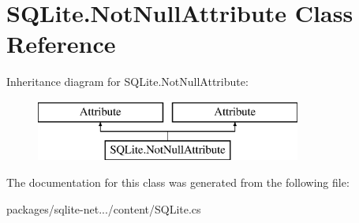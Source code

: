 \hypertarget{classSQLite_1_1NotNullAttribute}{\section{S\-Q\-Lite.\-Not\-Null\-Attribute Class Reference}
\label{classSQLite_1_1NotNullAttribute}
}
Inheritance diagram for S\-Q\-Lite.\-Not\-Null\-Attribute\-:\begin{figure}[H]
\begin{center}
\leavevmode
\includegraphics[height=2.000000cm]{classSQLite_1_1NotNullAttribute}
\end{center}
\end{figure}


The documentation for this class was generated from the following file\-:\begin{DoxyCompactItemize}
\item 
packages/sqlite-\/net.../content/S\-Q\-Lite.\-cs\end{DoxyCompactItemize}
